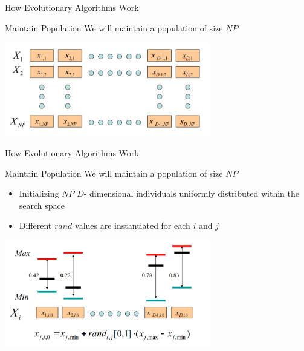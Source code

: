 \begin{frame}{How Evolutionary Algorithms Work}
\begin{center}
\begin{block}{Maintain Population}
We will maintain a population of size $NP$
\end{block}

\includegraphics[width=9cm]{new_images/EAs_pop.png} 

\end{center}
\end{frame}

\begin{frame}{How Evolutionary Algorithms Work}
\begin{center}
\begin{block}{Maintain Population}
We will maintain a population of size $NP$ 
\begin{itemize}
    \item Initializing $NP$ $D$- dimensional individuals uniformly distributed within the search space 
    \item Different $rand$ values are instantiated for each $i$ and $j$
\end{itemize}
\end{block}

\includegraphics[width=9cm]{new_images/EAs_ini.png} 

\end{center}
\end{frame}

